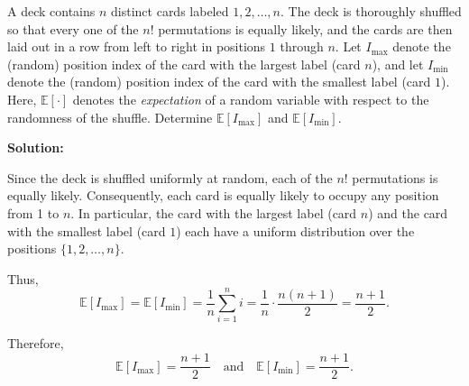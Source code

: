 \problem{}

A deck contains $n$ distinct cards labeled $1,2,\dots,n$. The deck is thoroughly shuffled so that every one of the $n!$ permutations is equally likely, and the cards are then laid out in a row from left to right in positions $1$ through $n$. Let $I_{\max}$ denote the (random) position index of the card with the largest label (card $n$), and let $I_{\min}$ denote the (random) position index of the card with the smallest label (card $1$). Here, $\mathbb{E}[\cdot]$ denotes the \emph{expectation} of a random variable with respect to the randomness of the shuffle. Determine $\mathbb{E}[I_{\max}]$ and $\mathbb{E}[I_{\min}]$.



\noindent \textbf{Solution:}

Since the deck is shuffled uniformly at random, each of the \(n!\) permutations is equally likely. Consequently, each card is equally likely to occupy any position from 1 to \(n\). In particular, the card with the largest label (card \(n\)) and the card with the smallest label (card \(1\)) each have a uniform distribution over the positions \(\{1, 2, \dots, n\}\).

Thus,
\[
\mathbb{E}[I_{\text{max}}] = \mathbb{E}[I_{\text{min}}] = \frac{1}{n} \sum_{i=1}^{n} i = \frac{1}{n} \cdot \frac{n(n+1)}{2} = \frac{n+1}{2}.
\]

Therefore,
\[
\mathbb{E}[I_{\text{max}}] = \frac{n+1}{2} \quad \text{and} \quad \mathbb{E}[I_{\text{min}}] = \frac{n+1}{2}.
\]

\newpage
